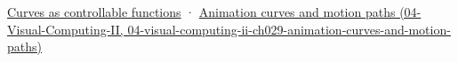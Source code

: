 \hyperref[03-visual-computing-i-ch001-curves-as-controllable-functions]{Curves as controllable functions} · \href{../04-Visual-Computing-II/main.pdf\#nameddest=04-visual-computing-ii-ch029-animation-curves-and-motion-paths}{Animation curves and motion paths (04-Visual-Computing-II, 04-visual-computing-ii-ch029-animation-curves-and-motion-paths)}
